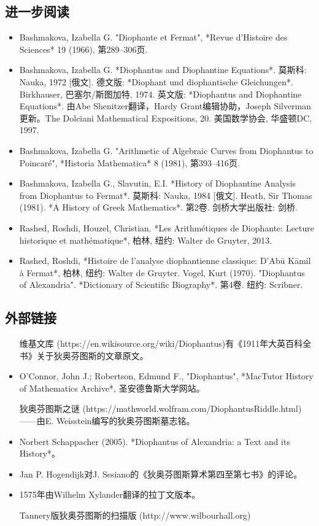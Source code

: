 \subsection{进一步阅读}
\begin{itemize}
\item Bashmakova, Izabella G. "Diophante et Fermat", *Revue d'Histoire des Sciences* 19 (1966), 第289–306页.  
\item Bashmakova, Izabella G. *Diophantus and Diophantine Equations*. 莫斯科: Nauka, 1972 [俄文]. 德文版: *Diophant und diophantische Gleichungen*. Birkhauser, 巴塞尔/斯图加特, 1974. 英文版: *Diophantus and Diophantine Equations*. 由Abe Shenitzer翻译，Hardy Grant编辑协助，Joseph Silverman更新。The Dolciani Mathematical Expositions, 20. 美国数学协会, 华盛顿DC, 1997.  
\item Bashmakova, Izabella G. "Arithmetic of Algebraic Curves from Diophantus to Poincaré", *Historia Mathematica* 8 (1981), 第393–416页.  
\item Bashmakova, Izabella G., Slavutin, E.I. *History of Diophantine Analysis from Diophantus to Fermat*. 莫斯科: Nauka, 1984 [俄文].  
Heath, Sir Thomas (1981). *A History of Greek Mathematics*. 第2卷. 剑桥大学出版社: 剑桥.  
\item Rashed, Roshdi, Houzel, Christian. *Les Arithmétiques de Diophante: Lecture historique et mathématique*, 柏林, 纽约: Walter de Gruyter, 2013.  
\item Rashed, Roshdi, *Histoire de l’analyse diophantienne classique: D’Abū Kāmil à Fermat*, 柏林, 纽约: Walter de Gruyter.  
Vogel, Kurt (1970). "Diophantus of Alexandria". *Dictionary of Scientific Biography*. 第4卷. 纽约: Scribner.
\end{itemize}
\subsection{外部链接}
\begin{itemize}
\item [维基文库](https://en.wikisource.org/wiki/Diophantus)有《1911年大英百科全书》关于狄奥芬图斯的文章原文。
\item O'Connor, John J.; Robertson, Edmund F., "Diophantus", *MacTutor History of Mathematics Archive*, 圣安德鲁斯大学网站。
\item [狄奥芬图斯之谜](https://mathworld.wolfram.com/DiophantusRiddle.html)——由E. Weisstein编写的狄奥芬图斯墓志铭。
\item Norbert Schappacher (2005). *Diophantus of Alexandria: a Text and its History*。
\item Jan P. Hogendijk对J. Sesiano的《狄奥芬图斯算术第四至第七书》的评论。
\item 1575年由Wilhelm Xylander翻译的拉丁文版本。 
\item [Tannery版狄奥芬图斯的扫描版](http://www.wilbourhall.org)
\end{itemize}